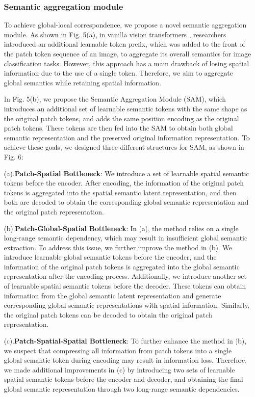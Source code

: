 \documentclass[lettersize,journal]{IEEEtran}
\begin{document}
\subsubsection{Semantic aggregation module}

To achieve global-local correspondence, we propose a novel semantic aggregation module. As shown in Fig. 5(a), in vanilla vision transformers \cite{r29}, researchers introduced an additional learnable token prefix, which was added to the front of the patch token sequence of an image, to aggregate its overall semantics for image classification tasks. However, this approach has a main drawback of losing spatial information due to the use of a single token. Therefore, we aim to aggregate global semantics while retaining spatial information.

In Fig. 5(b), we propose the Semantic Aggregation Module (SAM), which introduces an additional set of learnable semantic tokens with the same shape as the original patch tokens, and adds the same position encoding as the original patch tokens. These tokens are then fed into the SAM to obtain both global semantic representation and the preserved original information representation. To achieve these goals, we designed three different structures for SAM, as shown in Fig. 6:

(a).\textbf{Patch-Spatial Bottleneck}: We introduce a set of learnable spatial semantic tokens before the encoder. After encoding, the information of the original patch tokens is aggregated into the spatial semantic latent representation, and then both are decoded to obtain the corresponding global semantic representation and the original patch representation.

(b).\textbf{Patch-Global-Spatial Bottleneck}: In (a), the method relies on a single long-range semantic dependency, which may result in insufficient global semantic extraction. To address this issue, we further improve the method in (b). We introduce learnable global semantic tokens before the encoder, and the information of the original patch tokens is aggregated into the global semantic representation after the encoding process. Additionally, we introduce another set of learnable spatial semantic tokens before the decoder. These tokens can obtain information from the global semantic latent representation and generate corresponding global semantic representations with spatial information. Similarly, the original patch tokens can be decoded to obtain the original patch representation.

(c).\textbf{Patch-Spatial-Spatial Bottleneck}:
To further enhance the method in (b), we suspect that compressing all information from patch tokens into a single global semantic token during encoding may result in information loss. Therefore, we made additional improvements in (c) by introducing two sets of learnable spatial semantic tokens before the encoder and decoder, and obtaining the final global semantic representation through two long-range semantic dependencies.
\end{document}
